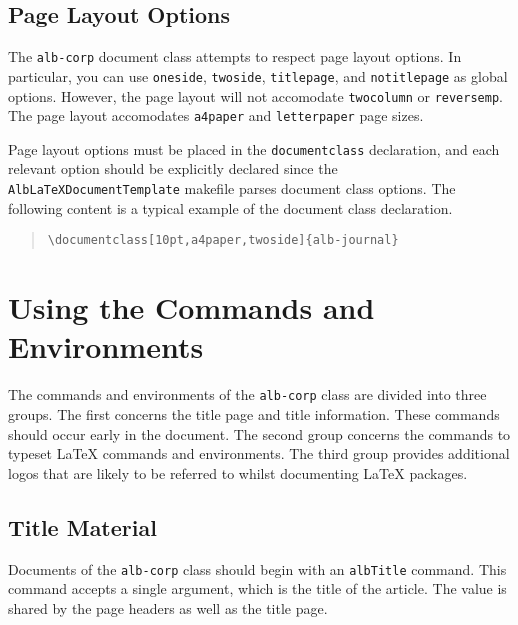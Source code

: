 \documentclass[11pt,a4paper,oneside,titlepage]{alb-corp}
\begin{document}
\subsection{Page Layout Options}
\label{sec:alb-corp-layout-documentation:page-layout-opti}

The \texttt{alb-corp} document class attempts to respect page layout
options.  In particular, you can use \texttt{oneside}, \texttt{twoside},
\texttt{titlepage}, and \texttt{notitlepage} as global options.
However, the page layout will not accomodate \texttt{twocolumn} or
\texttt{reversemp}.  The page layout accomodates \texttt{a4paper} and
\texttt{letterpaper} page sizes.

Page layout options must be placed in the \texttt{documentclass}
declaration, and each relevant option should be explicitly declared
since the \texttt{AlbLaTeXDocumentTemplate} makefile parses document
class options.  The following content is a typical example of the
document class declaration.
\begin{quote}
\begin{verbatim}
\documentclass[10pt,a4paper,twoside]{alb-journal}
\end{verbatim}
\end{quote}




\section{Using the Commands and Environments}
\label{sec:alb-corp-layout-documentation:using-comm-envir}

The commands and environments of the \texttt{alb-corp} class are divided
into three groups.  The first concerns the title page and title
information.  These commands should occur early in the document.  The
second group concerns the commands to typeset \LaTeX{} commands and
environments.  The third group provides additional logos that are likely
to be referred to whilst documenting \LaTeX{} packages.



\subsection{Title Material}
\label{sec:alb-corp-layout-documentation:title-mater}

Documents of the \texttt{alb-corp} class should begin with an
\texttt{albTitle} command.  This command accepts a single argument,
which is the title of the article.  The value is shared by the page
headers as well as the title page.
\end{document}
